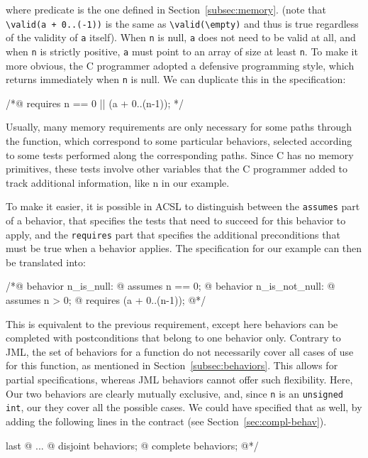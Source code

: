 where predicate \valid is the one defined in Section~\ref{subsec:memory}.
(note that \lstinline|\valid(a + 0..(-1))| is the same as
\lstinline|\valid(\empty)| and thus is true regardless of the validity of
\lstinline|a| itself).
When \lstinline|n| is null, \lstinline|a| does
not need to be valid at all, and when \lstinline|n| is strictly
positive, \lstinline|a| must point to an array of size at least
\lstinline|n|. To make it more obvious, the C programmer adopted a
defensive programming style, which returns immediately when \lstinline|n| is
null. We can duplicate this in the specification:

\begin{listing-nonumber}
/*@ requires n == 0 || \valid(a + 0..(n-1)); */
\end{listing-nonumber}

Usually, many memory requirements are only necessary for some paths
through the function, which correspond to some particular
behaviors, selected according to some tests performed along the
corresponding paths. Since C has no memory
primitives, these tests involve other variables that the C programmer
added to track additional information, like {\ttfamily n} in our example.

To make it easier, it is possible in ACSL to distinguish between the
\lstinline|assumes| part of a behavior, that specifies the tests that need
to succeed for this behavior to apply, and the \lstinline|requires| part
that specifies the additional preconditions that must be true when a
behavior applies. The specification for our example can then be
translated into:

\begin{listing}{1}
/*@ behavior n_is_null:
  @   assumes n == 0;
  @ behavior n_is_not_null:
  @   assumes n > 0;
  @   requires \valid(a + 0..(n-1));
  @*/
\end{listing}

This is equivalent to the previous requirement, except here behaviors
can be completed with postconditions that belong to one behavior only.
Contrary to JML, the set of behaviors for a function do not
necessarily cover all cases of use for this function, as mentioned in
Section~\ref{subsec:behaviors}. This allows for partial
specifications, whereas JML behaviors cannot offer such
flexibility. Here, Our two behaviors are clearly mutually exclusive,
and, since \lstinline|n| is an \lstinline|unsigned int|, our
they cover all the possible cases. We could have specified that as well, by
adding the following lines in the contract (see
Section~\ref{sec:compl-behav}).
\begin{listing}{last}
  @ ...
  @ disjoint behaviors;
  @ complete behaviors;
  @*/
\end{listing}

